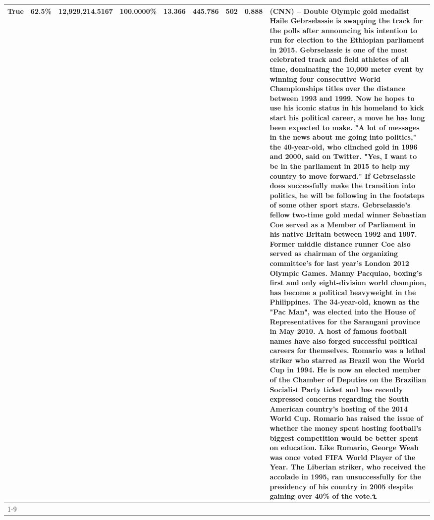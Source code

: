 \begin{table}[H]
{\begin{tabular}{lllrlllll}
True & 62.5\% & 12,929,214.5167 & \bfseries \color{red} 100.0000\% & 13.366 & 445.786 & 502 & 0.888 & (CNN) -- Double Olympic gold medalist Haile Gebrselassie is swapping the track for the polls after announcing his intention to run for election to the Ethiopian parliament in 2015. Gebrselassie is one of the most celebrated track and field athletes of all time, dominating the 10,000 meter event by winning four consecutive World Championships titles over the distance between 1993 and 1999. Now he hopes to use his iconic status in his homeland to kick start his political career, a move he has long been expected to make. "A lot of messages in the news about me going into politics," the 40-year-old, who clinched gold in 1996 and 2000, said on Twitter. "Yes, I want to be in the parliament in 2015 to help my country to move forward." If Gebrselassie does successfully make the transition into politics, he will be following in the footsteps of some other sport stars. Gebrselassie's fellow two-time gold medal winner Sebastian Coe served as a Member of Parliament in his native Britain between 1992 and 1997. Former middle distance runner Coe also served as chairman of the organizing committee's for last year's London 2012 Olympic Games. Manny Pacquiao, boxing's first and only eight-division world champion, has become a political heavyweight in the Philippines. The 34-year-old, known as the "Pac Man", was elected into the House of Representatives for the Sarangani province in May 2010. A host of famous football names have also forged successful political careers for themselves. Romario was a lethal striker who starred as Brazil won the World Cup in 1994. He is now an elected member of the Chamber of Deputies on the Brazilian Socialist Party ticket and has recently expressed concerns regarding the South American country's hosting of the 2014 World Cup. Romario has raised the issue of whether the money spent hosting football's biggest competition would be better spent on education. Like Romario, George Weah was once voted FIFA World Player of the Year. The Liberian striker, who received the accolade in 1995, ran unsuccessfully for the presidency of his country in 2005 despite gaining over 40\% of the vote.ጊ \\
\cline{1-9}

\end{tabular}}
\end{table}
